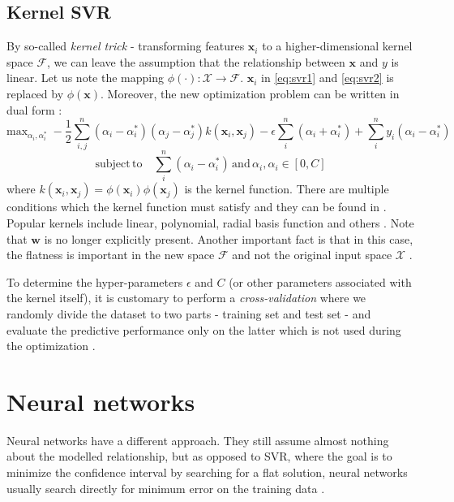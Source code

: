 \subsection*{Kernel SVR}
By so-called \textit{kernel trick} - transforming features $\bm{x}_i$ to a higher-dimensional kernel space $\mathcal{F}$, we can leave the assumption that the relationship between $\bm{x}$ and $y$ is linear. Let us note the mapping $\phi(\cdot): \mathcal{X} \rightarrow \mathcal{F}$. $\bm{x}_i$ in \ref{eq:svr1} and \ref{eq:svr2} is replaced by $\phi(\bm{x})$. Moreover, the new optimization problem can be written in dual form \cite{smola2004}:
\begin{equation}
	\mathrm{max}_{\alpha_i,\alpha_i^*} \; -\frac{1}{2}\sum_{i,j}^{n}\left(\alpha_i - \alpha_i^*\right)\left(\alpha_j - \alpha_j^*\right)k(\bm{x}_i,\bm{x}_j) -\epsilon\sum_{i}^{n}\left(\alpha_i + \alpha_i^*\right) + \sum_{i}^{n}y_i\left(\alpha_i - \alpha_i^*\right)
\end{equation}
\begin{equation}
	\mathrm{subject}\,\mathrm{to}\quad  \sum_{i}^{n}\left(\alpha_i - \alpha_i^*\right) \,\mathrm{and}\, \alpha_i, \alpha_i \in \left[0,C\right]
\end{equation}
where $k(\bm{x}_i,\bm{x}_j) = \phi(\bm{x}_i)\phi(\bm{x}_j)$ is the kernel function. There are multiple conditions which the kernel function must satisfy and they can be found in \cite{smola2004}. Popular kernels include linear, polynomial, radial basis function and others \cite{zhang2020}.
Note that $\bm{w}$ is no longer explicitly present. Another important fact is that in this case, the flatness is important in the new space $\mathcal{F}$ and not the original input space $\mathcal{X}$ \cite{smola2004}.

To determine the hyper-parameters $\epsilon$ and $C$ (or other parameters associated with the kernel itself), it is customary to perform a \textit{cross-validation} where we randomly divide the dataset to two parts - training set and test set - and evaluate the predictive performance only on the latter which is not used during the optimization \cite{zhang2020}.

\section{Neural networks}
Neural networks have a different approach. They still assume almost nothing about the modelled relationship, but as opposed to SVR, where the goal is to minimize the confidence interval by searching for a flat solution, neural networks usually search directly for minimum error on the training data \cite{vapnik2000}. 

